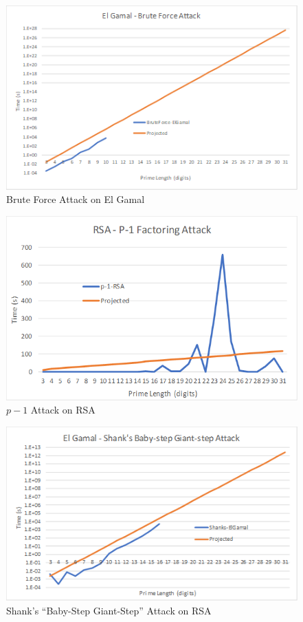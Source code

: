 \documentclass[12pt]{report}
\begin{document}
\begin{figure}[hp!] %
    \begin{center}
        \includegraphics[width=0.85\linewidth]{Pictures/ElGamalBrute.PNG}
        \caption{Brute Force Attack on El Gamal}
        \label{fig:el-gamal1}
    \end{center}
\end{figure}

\begin{figure}[hp!] %
    \begin{center}
        \includegraphics[width=0.85\linewidth]{Pictures/RSAp-1.PNG}
        \caption{$p-1$ Attack on RSA}
        \label{fig:rsa2}
    \end{center}
\end{figure}

\begin{figure}[hp!] %
    \begin{center}
        \includegraphics[width=0.85\linewidth]{Pictures/ElGamalShanks.PNG}
        \caption{Shank's ``Baby-Step Giant-Step'' Attack on RSA}
        \label{fig:el-gamal2}
    \end{center}
\end{figure}
\end{document}
